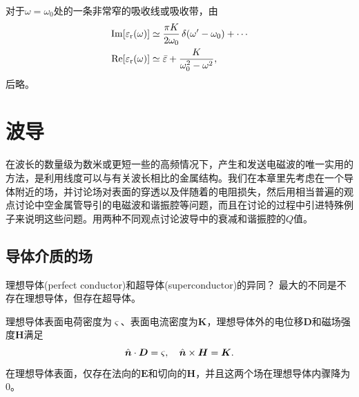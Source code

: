 对于$\omega=\omega_0$处的一条非常窄的吸收线或吸收带，由
\begin{align*}
    \operatorname{Im}[\varepsilon_\text r(\omega)]&\simeq\frac{\pi K}{2\omega_0}\mathop{}\!\delta(\omega'-\omega_0)+\cdots\\
    \operatorname{Re}[\varepsilon_\text r(\omega)]&\simeq\bar\varepsilon+\frac K{\omega_0^2-\omega^2},
\end{align*}
后略。
\clearpage
\section{波导}
\label{sec:waveguide}
在波长的数量级为数米或更短一些的高频情况下，产生和发送电磁波的唯一实用的方法，是利用线度可以与有关波长相比的金属结构。我们在本章里先考虑在一个导体附近的场，并讨论场对表面的穿透以及伴随着的电阻损失，然后用相当普遍的观点讨论中空金属管导引的电磁波和谐振腔等问题，而且在讨论的过程中引进特殊例子来说明这些问题。用两种不同观点讨论波导中的衰减和谐振腔的$Q$值。%

\subsection{导体介质的场}
理想导体(perfect conductor)和超导体(superconductor)的异同？
最大的不同是不存在理想导体，但存在超导体。

理想导体表面电荷密度为$\varsigma$、表面电流密度为$\bm K$，理想导体外的电位移$\bm D$和磁场强度$\bm H$满足
\[
    \mathop{}\!\hat{\bm n}\cdot\bm D=\varsigma,\quad\mathop{}\!\hat{\bm n}\times\bm H=\bm K.
\]
在理想导体表面，仅存在法向的$\bm E$和切向的$\bm H$，并且这两个场在理想导体内骤降为0。

